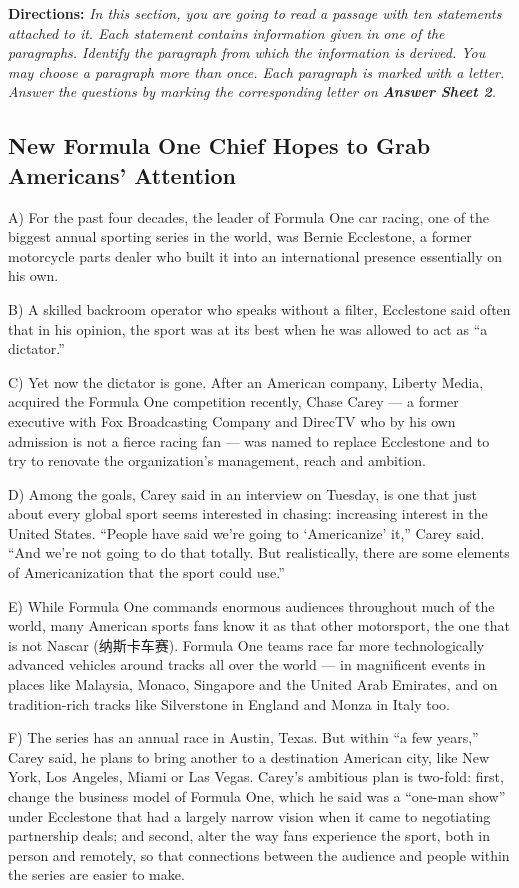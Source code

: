 \documentclass[UTF8,11pt]{ctexart}
\begin{document}
\textbf{Directions:} \textit{In this section, you are going to read a passage with ten statements attached to it. Each statement} \textit{contains information given in one of the paragraphs. Identify the paragraph from which the information is} \textit{derived. You may choose a paragraph more than once. Each paragraph is marked with a letter. Answer the} \textit{questions by marking the corresponding letter on }\textbf{\textit{Answer Sheet 2}}\textit{.}


\subsection*{\textbf{New Formula One Chief Hopes to Grab Americans’ Attention}}


A) For the past four decades, the leader of Formula One car racing, one of the biggest annual sporting series in the world, was Bernie Ecclestone, a former motorcycle parts dealer who built it into an international presence essentially on his own.


B) A skilled backroom operator who speaks without a filter, Ecclestone said often that in his opinion, the sport was at its best when he was allowed to act as “a dictator.”


C) Yet now the dictator is gone. After an American company, Liberty Media, acquired the Formula One competition recently, Chase Carey — a former executive with Fox Broadcasting Company and DirecTV who by his own admission is not a fierce racing fan — was named to replace Ecclestone and to try to renovate the organization’s management, reach and ambition.


D) Among the goals, Carey said in an interview on Tuesday, is one that just about every global sport seems interested in chasing: increasing interest in the United States. “People have said we’re going to ‘Americanize’ it,” Carey said. “And we’re not going to do that totally. But realistically, there are some elements of Americanization that the sport could use.”


E) While Formula One commands enormous audiences throughout much of the world, many American sports fans know it as that other motorsport, the one that is not Nascar (纳斯卡车赛). Formula One teams race far more technologically advanced vehicles around tracks all over the world — in magnificent events in places like Malaysia, Monaco, Singapore and the United Arab Emirates, and on tradition-rich tracks like Silverstone in England and Monza in Italy too.


F) The series has an annual race in Austin, Texas. But within “a few years,” Carey said, he plans to bring another to a destination American city, like New York, Los Angeles, Miami or Las Vegas. Carey’s ambitious plan is two-fold: first, change the business model of Formula One, which he said was a “one-man show” under Ecclestone that had a largely narrow vision when it came to negotiating partnership deals; and second, alter the way fans experience the sport, both in person and remotely, so that connections between the audience and people within the series are easier to make.
\end{document}
